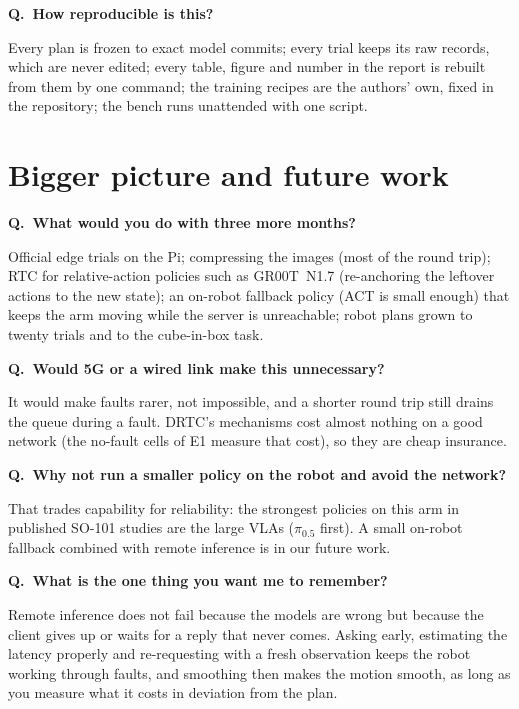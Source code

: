 \documentclass[11pt,a4paper]{article}
\newcommand{\drtc}{DRTC}
\newcommand{\pizerofive}{$\pi_{0.5}$}
\newcounter{qn}
\newcommand{\q}[2]{\stepcounter{qn}\par\medskip
  {\bfseries\color{accent}Q\theqn.\ #1}\par\nopagebreak[4]#2\par}
\begin{document}
\q{How reproducible is this?}{Every plan is frozen to exact model commits; every trial keeps its raw records, which are
never edited; every table, figure and number in the report is rebuilt from them by one command; the training recipes are
the authors' own, fixed in the repository; the bench runs unattended with one script.}

\section{Bigger picture and future work}

\q{What would you do with three more months?}{Official edge trials on the Pi; compressing the images (most of the
round trip); RTC for relative-action policies such as GR00T~N1.7 (re-anchoring the leftover actions to the new state);
an on-robot fallback policy (ACT is small enough) that keeps the arm moving while the server is unreachable; robot
plans grown to twenty trials and to the cube-in-box task.}

\q{Would 5G or a wired link make this unnecessary?}{It would make faults rarer, not impossible, and a shorter round
trip still drains the queue during a fault. \drtc's mechanisms cost almost nothing on a good network (the no-fault
cells of E1 measure that cost), so they are cheap insurance.}

\q{Why not run a smaller policy on the robot and avoid the network?}{That trades capability for reliability: the
strongest policies on this arm in published SO-101 studies are the large VLAs (\pizerofive{} first). A small on-robot
fallback combined with remote inference is in our future work.}

\q{What is the one thing you want me to remember?}{Remote inference does not fail because the models are wrong but
because the client gives up or waits for a reply that never comes. Asking early, estimating the latency properly and
re-requesting with a fresh observation keeps the robot working through faults, and smoothing then makes the motion
smooth, as long as you measure what it costs in deviation from the plan.}
\end{document}
